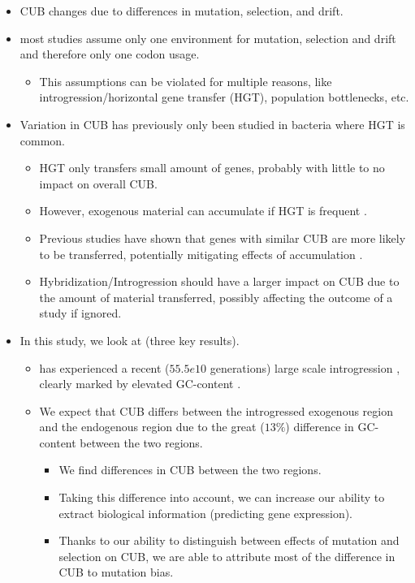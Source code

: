 \documentclass[12pt]{article}
\begin{document}
\begin{itemize}
	\item CUB changes due to differences in mutation, selection, and drift.
	\item most studies assume only one environment for mutation, selection and drift and therefore only one codon usage.
	\begin{itemize}
		\item This assumptions can be violated for multiple reasons, like introgression/horizontal gene transfer (HGT), population bottlenecks, etc.
	\end{itemize}
	 \item Variation in CUB has previously only been studied in bacteria where HGT is common.
	\begin{itemize}
		\item HGT only transfers small amount of genes, probably with little to no impact on overall CUB.
		\item However, exogenous material can accumulate if HGT is frequent \citep{lawrence1997}.
		\item Previous studies have shown that genes with similar CUB are more likely to be transferred, potentially mitigating effects of accumulation \citep{tuller2011}.
		\item Hybridization/Introgression should have a larger impact on CUB due to the amount of material transferred, possibly affecting the outcome of a study if ignored. 
	\end{itemize}
	\item In this study, we look at \kluyveri (three key results).
	\begin{itemize}
		\item \kluyveri has experienced a recent ($55.5e10$ generations) large scale introgression \citep{friedrich2015}, clearly marked by elevated GC-content \citep{payen2009}.
		\item We expect that CUB differs between the introgressed exogenous region and the endogenous region due to the great ($13 \%$) difference in GC-content between the two regions.
		\begin{itemize}
			\item We find differences in CUB between the two regions.
			\item Taking this difference into account, we can increase our ability to extract biological information (predicting gene expression).
			\item Thanks to our ability to distinguish between effects of mutation and selection on CUB, we are able to attribute most of the difference in CUB to mutation bias.

\end{itemize}
\end{itemize}
\end{itemize}
\end{document}
